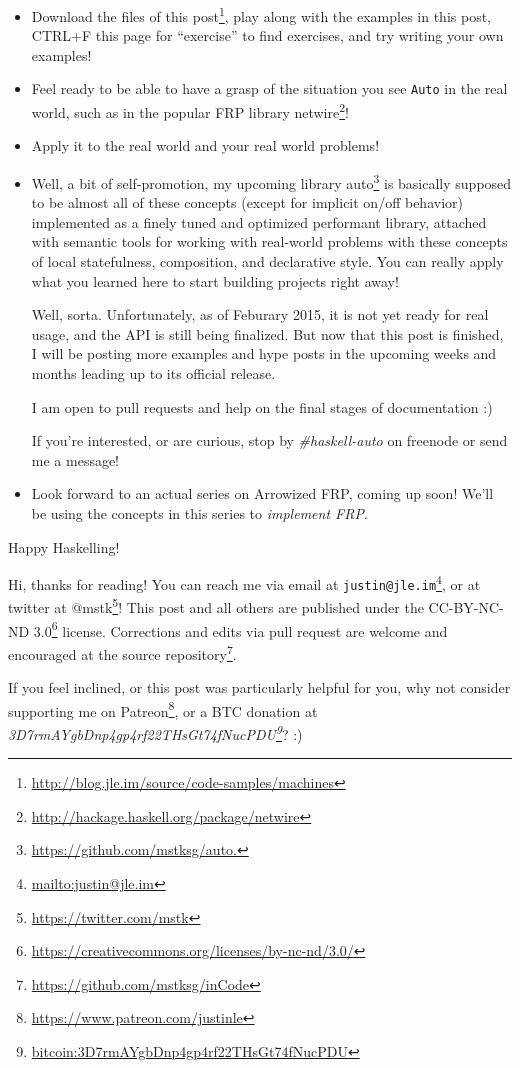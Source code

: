 \documentclass[]{article}
\renewcommand{\href}[2]{#2\footnote{\url{#1}}}
\begin{document}
\begin{itemize}
\item
  \href{http://blog.jle.im/source/code-samples/machines}{Download the files of
  this post}, play along with the examples in this post, CTRL+F this page for
  ``exercise'' to find exercises, and try writing your own examples!
\item
  Feel ready to be able to have a grasp of the situation you see \texttt{Auto}
  in the real world, such as in the popular FRP library
  \href{http://hackage.haskell.org/package/netwire}{netwire}!
\item
  Apply it to the real world and your real world problems!
\item
  Well, a bit of self-promotion, my upcoming library
  \href{https://github.com/mstksg/auto.}{auto} is basically supposed to be
  almost all of these concepts (except for implicit on/off behavior) implemented
  as a finely tuned and optimized performant library, attached with semantic
  tools for working with real-world problems with these concepts of local
  statefulness, composition, and declarative style. You can really apply what
  you learned here to start building projects right away!

  Well, sorta. Unfortunately, as of Feburary 2015, it is not yet ready for real
  usage, and the API is still being finalized. But now that this post is
  finished, I will be posting more examples and hype posts in the upcoming weeks
  and months leading up to its official release.

  I am open to pull requests and help on the final stages of documentation :)

  If you're interested, or are curious, stop by \emph{\#haskell-auto} on
  freenode or send me a message!
\item
  Look forward to an actual series on Arrowized FRP, coming up soon! We'll be
  using the concepts in this series to \emph{implement FRP}.
\end{itemize}

Happy Haskelling!

Hi, thanks for reading! You can reach me via email at
\href{mailto:justin@jle.im}{\nolinkurl{justin@jle.im}}, or at twitter at
\href{https://twitter.com/mstk}{@mstk}! This post and all others are published
under the \href{https://creativecommons.org/licenses/by-nc-nd/3.0/}{CC-BY-NC-ND
3.0} license. Corrections and edits via pull request are welcome and encouraged
at \href{https://github.com/mstksg/inCode}{the source repository}.

If you feel inclined, or this post was particularly helpful for you, why not
consider \href{https://www.patreon.com/justinle}{supporting me on Patreon}, or a
BTC donation at
\emph{\href{bitcoin:3D7rmAYgbDnp4gp4rf22THsGt74fNucPDU}{3D7rmAYgbDnp4gp4rf22THsGt74fNucPDU}}?
:)
\end{document}
